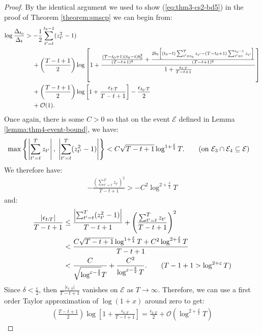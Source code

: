 \begin{proof}
By the identical argument we used to show (\ref{eq:thm3-cs2-bd5}) in the proof of Theorem \ref{theorem:smscp} we can begin from:
\begin{align}
    \log \frac{\Delta_{t_0}}{\Delta_t} &> - \frac{1}{2} \sum_{t' = t}^{t_0 - 1} (z_{t'}^2-1) \notag\\
    &\quad\: + \left(\frac{T - t +1}{2}\right)\log\left[1 +\frac{\frac{(T-t_0+1)(t_0-t)b_0^2}{(T-t+1)^2} + \frac{2b_0\left[(t_0-t)\sum_{t'=t_0}^{T} z_{t'} - (T-t_0+1)\sum_{t'=t}^{t_0-1} z_{t'}\right]}{(T-t+1)^2}}{1 + \frac{\epsilon_{t:T}}{T-t+1}} \right]\notag \\
    &\quad\: + \left(\frac{T - t +1}{2}\right)\log \left[1 + \frac{\epsilon_{t:T}}{T-t+1}\right]-\frac{\epsilon_{t_0:T}}{2} \notag\\
    &\quad\: + \mathcal{O}(1).\label{eq:thm4-cs2-bd4}
\end{align}
Once again, there is some $C>0$ so that on the event $\mathcal{E}$ defined in Lemma \ref{lemma:thm4-event-bound}, we have:
\begin{align*}
    \max\left\{\left|\sum_{t'=t}^{T} z_{t'} \right|,\; \left|\sum_{t'=t}^{T} (z^2_{t'}-1)\right|\right\}&< C\sqrt{T-t+1}\log^{1+\frac{\delta}{4}} T. \tag{on $\mathcal{E}_3\cap\mathcal{E}_4 \subseteq\mathcal{E}$}
\end{align*}
We therefore have:
\begin{align*}
    - \frac{\left(\sum_{t'=t}^T z_{t'}\right)^2}{T-t+1} > - C^2\log^{2 + \frac{\delta}{2}} T
\end{align*}
and: 
\begin{align*}
    \frac{|\epsilon_{t:T}|}{T-t+1} &\leq \frac{\left|\sum_{t'=t}^{T} (z^2_{t'}-1)\right|}{T-t+1} + \left(\frac{\sum_{t'=t}^{T} z_{t'}}{T-t+1} \right)^2 \\
    &<\frac{C\sqrt{T-t+1}\log^{1+\frac{\delta}{4}} T + C^2\log^{2 + \frac{\delta}{2}} T}{T-t+1} \\
    &< \frac{C}{\sqrt{\log^{\varepsilon-\frac{\delta}{2}}}T} + \frac{C^2}{\log^{\varepsilon - \frac{\delta}{2}}T}. \tag{$T-1+1 > \log^{2+\varepsilon} T$}
\end{align*}
Since $\delta < \frac{\varepsilon}{2}$, then $\frac{|\epsilon_{t:T}|}{T-t+1}$ vanishes on $\mathcal{E}$ as $T\to\infty$. Therefore, we can use a first order Taylor approximation of $\log(1+x)$ around zero to get: 
\begin{align*}
    \left(\frac{T - t +1}{2}\right)\log\left[1 + \frac{\epsilon_{t:T}}{T-t+1}\right] = \frac{\epsilon_{t:T}}{2} + \mathcal{O}\left(\log^{2+\frac{\delta}{2}} T\right)

\end{align*}
\end{proof}
